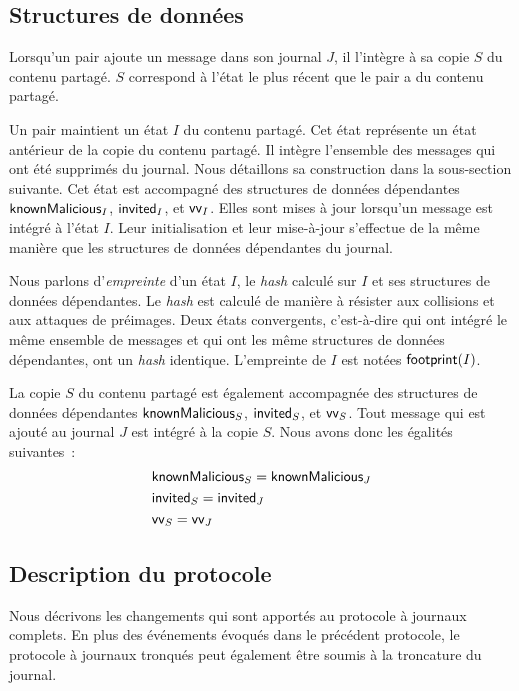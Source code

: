 \subsection{Structures de données}

Lorsqu'un pair ajoute un message dans son journal $J$, il l'intègre à sa copie $S$ du contenu partagé.
$S$ correspond à l'état le plus récent que le pair a du contenu partagé.


Un pair maintient un état $I$ du contenu partagé.
Cet état représente un état antérieur de la copie du contenu partagé.
Il intègre l'ensemble des messages qui ont été supprimés du journal.
Nous détaillons sa construction dans la sous-section suivante.
Cet état est accompagné des structures de données dépendantes $\operatorname{\mathsf{knownMalicious}}_I$, $\operatorname{\mathsf{invited}}_I$, et $\operatorname{\mathsf{vv}}_I$.
Elles sont mises à jour lorsqu'un message est intégré à l'état $I$.
Leur initialisation et leur mise-à-jour s'effectue de la même manière que les structures de données dépendantes du journal.

Nous parlons d'\emph{empreinte} d'un état $I$, le \emph{hash} calculé sur $I$ et ses structures de données dépendantes.
Le \emph{hash} est calculé de manière à résister aux collisions et aux attaques de préimages.
Deux états convergents, c'est-à-dire qui ont intégré le même ensemble de messages et qui ont les même structures de données dépendantes, ont un \emph{hash} identique.
L'empreinte de $I$ est notées $\operatorname{\mathsf{footprint}}(I)$.

La copie $S$ du contenu partagé est également accompagnée des structures de données dépendantes $\operatorname{\mathsf{knownMalicious}}_S$, $\operatorname{\mathsf{invited}}_S$, et $\operatorname{\mathsf{vv}}_S$.
Tout message qui est ajouté au journal $J$ est intégré à la copie $S$.
Nous avons donc les égalités suivantes~:
\begin{align*}
&\operatorname{\mathsf{knownMalicious}}_S = \operatorname{\mathsf{knownMalicious}}_J\\
&\operatorname{\mathsf{invited}}_S = \operatorname{\mathsf{invited}}_J\\
&\operatorname{\mathsf{vv}}_S = \operatorname{\mathsf{vv}}_J
\end{align*}


\subsection{Description du protocole}

Nous décrivons les changements qui sont apportés au protocole à journaux complets.
En plus des événements évoqués dans le précédent protocole, le protocole à journaux tronqués peut également être soumis à la troncature du journal.

